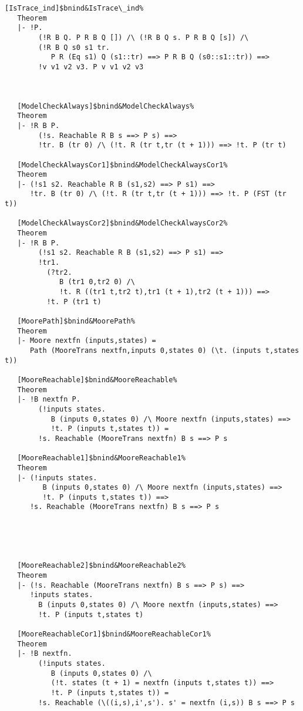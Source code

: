 \documentclass[12pt]{article}
\renewcommand{\t}[1]{\mbox{\tt #1}}
\begin{document}
\begin{footnotesize}
\begin{Verbatim}[commandchars=\$\&\%]
   [IsTrace_ind]$bnind&IsTrace\_ind%
   Theorem
   |- !P.
        (!R B Q. P R B Q []) /\ (!R B Q s. P R B Q [s]) /\
        (!R B Q s0 s1 tr.
           P R (Eq s1) Q (s1::tr) ==> P R B Q (s0::s1::tr)) ==>
        !v v1 v2 v3. P v v1 v2 v3
   


   [ModelCheckAlways]$bnind&ModelCheckAlways%
   Theorem
   |- !R B P.
        (!s. Reachable R B s ==> P s) ==>
        !tr. B (tr 0) /\ (!t. R (tr t,tr (t + 1))) ==> !t. P (tr t)
   
   [ModelCheckAlwaysCor1]$bnind&ModelCheckAlwaysCor1%
   Theorem
   |- (!s1 s2. Reachable R B (s1,s2) ==> P s1) ==>
      !tr. B (tr 0) /\ (!t. R (tr t,tr (t + 1))) ==> !t. P (FST (tr t))
   
   [ModelCheckAlwaysCor2]$bnind&ModelCheckAlwaysCor2%
   Theorem
   |- !R B P.
        (!s1 s2. Reachable R B (s1,s2) ==> P s1) ==>
        !tr1.
          (?tr2.
             B (tr1 0,tr2 0) /\
             !t. R ((tr1 t,tr2 t),tr1 (t + 1),tr2 (t + 1))) ==>
          !t. P (tr1 t)
   
   [MoorePath]$bnind&MoorePath%
   Theorem
   |- Moore nextfn (inputs,states) =
      Path (MooreTrans nextfn,inputs 0,states 0) (\t. (inputs t,states t))
   
   [MooreReachable]$bnind&MooreReachable%
   Theorem
   |- !B nextfn P.
        (!inputs states.
           B (inputs 0,states 0) /\ Moore nextfn (inputs,states) ==>
           !t. P (inputs t,states t)) =
        !s. Reachable (MooreTrans nextfn) B s ==> P s
   
   [MooreReachable1]$bnind&MooreReachable1%
   Theorem
   |- (!inputs states.
         B (inputs 0,states 0) /\ Moore nextfn (inputs,states) ==>
         !t. P (inputs t,states t)) ==>
      !s. Reachable (MooreTrans nextfn) B s ==> P s
   




   [MooreReachable2]$bnind&MooreReachable2%
   Theorem
   |- (!s. Reachable (MooreTrans nextfn) B s ==> P s) ==>
      !inputs states.
        B (inputs 0,states 0) /\ Moore nextfn (inputs,states) ==>
        !t. P (inputs t,states t)
   
   [MooreReachableCor1]$bnind&MooreReachableCor1%
   Theorem
   |- !B nextfn.
        (!inputs states.
           B (inputs 0,states 0) /\
           (!t. states (t + 1) = nextfn (inputs t,states t)) ==>
           !t. P (inputs t,states t)) =
        !s. Reachable (\((i,s),i',s'). s' = nextfn (i,s)) B s ==> P s
   

\end{Verbatim}
\end{footnotesize}
\end{document}
